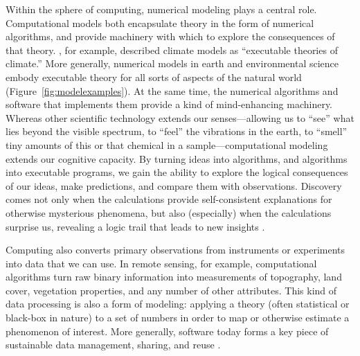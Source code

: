 \documentclass[12pt]{amsart}
\begin{document}
Within the sphere of computing, numerical modeling plays a central role. Computational models both encapsulate theory in the form of numerical algorithms, and provide machinery with which to explore the consequences of that theory. \citet{pipitone2012assessing}, for example, described climate models as ``executable theories of climate.'' More generally, numerical models in earth and environmental science embody executable theory for all sorts of aspects of the natural world (Figure~\ref{fig:modelexamples}). At the same time, the numerical algorithms and software that implements them provide a kind of mind-enhancing machinery. Whereas other scientific technology extends our senses---allowing us to ``see'' what lies beyond the visible spectrum, to ``feel'' the vibrations in the earth, to ``smell'' tiny amounts of this or that chemical in a sample---computational modeling extends our cognitive capacity. By turning ideas into algorithms, and algorithms into executable programs, we gain the ability to explore the logical consequences of our ideas, make predictions, and compare them with observations. Discovery comes not only when the calculations provide self-consistent explanations for otherwise mysterious phenomena, but also (especially) when the calculations surprise us, revealing a logic trail that leads to new insights \citep{bras2003six}.


Computing also converts primary observations from instruments or experiments into data that we can use. In remote sensing, for example, computational algorithms turn raw binary information into measurements of topography, land cover, vegetation properties, and any number of other attributes. This kind of data processing is also a form of modeling: applying a theory (often statistical or black-box in nature) to a set of numbers in order to map or otherwise estimate a phenomenon of interest. More generally, software today forms a key piece of sustainable data management, sharing, and reuse \citep[e.g.,][]{hsu2015data}.
\end{document}
